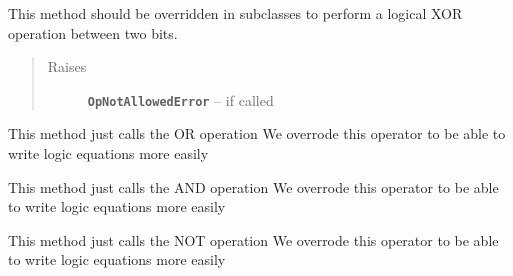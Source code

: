 \documentclass[letterpaper,10pt,english]{sphinxmanual}
\begin{document}
\begin{fulllineitems}
\begin{fulllineitems}
\begin{quote}
\begin{description}
\end{description}\end{quote}

\end{fulllineitems}


\begin{fulllineitems}
\label{datatypes.bits:datatypes.bits.Bit.Bit.XOR}
This method should be overridden in subclasses to perform a logical XOR operation between two bits.
\begin{quote}\begin{description}
\item[{Raises}] \leavevmode
\textbf{\texttt{OpNotAllowedError}} -- if called

\end{description}\end{quote}

\end{fulllineitems}


\begin{fulllineitems}
\label{datatypes.bits:datatypes.bits.Bit.Bit.__add__}
This method just calls the OR operation
We overrode this operator to be able to write logic equations more easily

\end{fulllineitems}


\begin{fulllineitems}
\label{datatypes.bits:datatypes.bits.Bit.Bit.__and__}
This method just calls the AND operation
We overrode this operator to be able to write logic equations more easily

\end{fulllineitems}


\begin{fulllineitems}
\label{datatypes.bits:datatypes.bits.Bit.Bit.__invert__}
This method just calls the NOT operation
We overrode this operator to be able to write logic equations more easily


\end{fulllineitems}
\end{fulllineitems}
\end{document}
